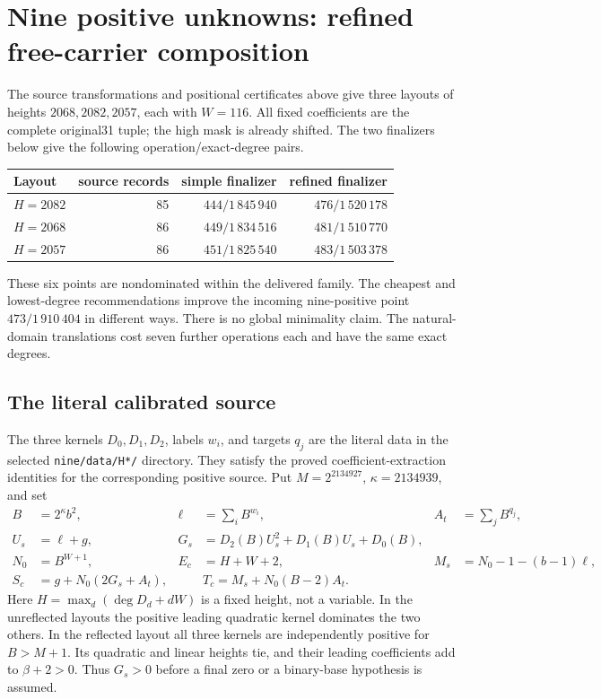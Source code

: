 \section{Nine positive unknowns: refined free-carrier composition}
\label{sec:refined-free-nine}

The source transformations and positional certificates above give three
layouts of heights $2068,2082,2057$, each with $W=116$.  All fixed coefficients
are the complete original31 tuple; the high mask is already shifted.
The two finalizers below give the following operation/exact-degree pairs.
\begin{center}
\begin{tabular}{lrrr}
Layout&source records&simple finalizer&refined finalizer\\\hline
$H=2082$&85&$444/1\,845\,940$&$476/1\,520\,178$\\
$H=2068$&86&$449/1\,834\,516$&$481/1\,510\,770$\\
$H=2057$&86&$451/1\,825\,540$&$483/1\,503\,378$
\end{tabular}
\end{center}
These six points are nondominated within the delivered family.  The cheapest
and lowest-degree recommendations improve the incoming nine-positive point
$473/1\,910\,404$ in different ways.  There is no global minimality claim.
The natural-domain translations cost seven further operations each and have
the same exact degrees.

\subsection{The literal calibrated source}
The three kernels $D_0,D_1,D_2$, labels $w_i$, and targets $q_j$ are the
literal data in the selected \texttt{nine/data/H*/} directory.  They satisfy
the proved coefficient-extraction identities for the corresponding positive
source.  Put $M=2^{2134927}$, $\kappa=2134939$, and set
\begin{align*}
 B&=2^\kappa b^2,&\ell&=\sum_i B^{w_i},& A_t&=\sum_jB^{q_j},\\
 U_s&=\ell+g,&G_s&=D_2(B)U_s^2+D_1(B)U_s+D_0(B),\\
 N_0&=B^{W+1},&E_c&=H+W+2,&M_s&=N_0-1-(b-1)\ell,\\
 S_c&=g+N_0(2G_s+A_t),&&T_c=M_s+N_0(B-2)A_t.
\end{align*}
Here $H=\max_d(\deg D_d+dW)$ is a fixed height, not a variable.
In the unreflected layouts the positive leading quadratic kernel dominates
the two others.  In the reflected layout all three kernels are independently
positive for $B>M+1$.  Its quadratic and linear heights tie, and their
leading coefficients add to $\beta+2>0$.  Thus $G_s>0$ before a final zero
or a binary-base hypothesis is assumed.

